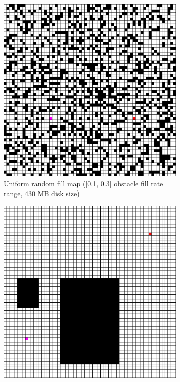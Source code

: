 \begin{figure}[h!]
  \centering
  \begin{subfigure}[b]{0.30\linewidth}
    \includegraphics[width=\linewidth]{images/screenshot_52.png}
     \caption{Uniform random fill map ([0.1, 0.3] obstacle fill rate range, 430 MB disk size)\newline}
  \end{subfigure}
  \hfill
  \begin{subfigure}[b]{0.30\linewidth}
    \includegraphics[width=\linewidth]{images/screenshot_54.png}

\end{subfigure}
\end{figure}
